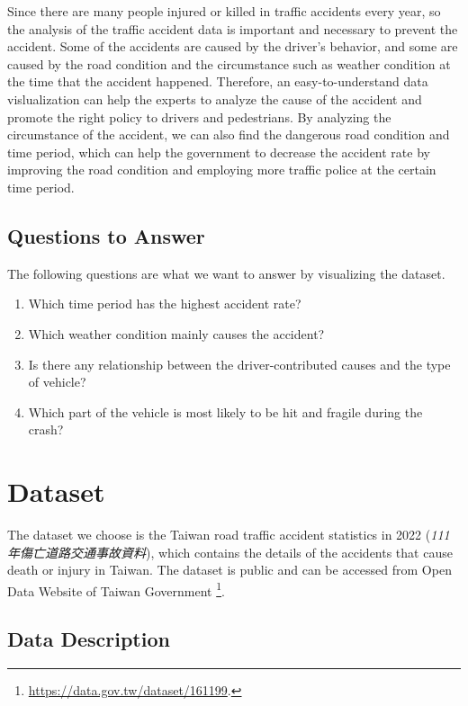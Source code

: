 \documentclass[a4paper, oneside, final, 12pt]{scrartcl} %
\begin{document}
  Since there are many people injured or killed in traffic accidents every year,
  so the analysis of the traffic accident data 
  is important and necessary to prevent the accident.
  Some of the accidents are caused by the driver's behavior,
  and some are caused by the road condition 
  and the circumstance such as weather condition at the time that the accident happened.
  Therefore, an easy-to-understand data vislualization 
  can help the experts to analyze the cause of the accident
  and promote the right policy to drivers and pedestrians.
  By analyzing the circumstance of the accident,
  we can also find the dangerous road condition and time period,
  which can help the government to decrease the accident rate 
  by improving the road condition and employing more traffic police at the certain time period.
  
  \subsection{Questions to Answer}
  
  The following questions are what we want to answer by visualizing the dataset.
  
  \begin{enumerate}
    \item Which time period has the highest accident rate?
    \item Which weather condition mainly causes the accident?
    \item Is there any relationship between the 
    driver-contributed causes and the type of vehicle?
    \item Which part of the vehicle is most likely to be hit and fragile during the crash?
  \end{enumerate}

\section{Dataset}

\begingroup
\raggedright

The dataset we choose is the Taiwan road traffic accident statistics 
in 2022 (\emph{111年傷亡道路交通事故資料}), which contains the details of
the accidents that cause death or injury in Taiwan.
The dataset is public and can be accessed from Open Data Website of Taiwan Government
\footnote{\url{https://data.gov.tw/dataset/161199}.}.

\subsection{Data Description}
\end{document}
